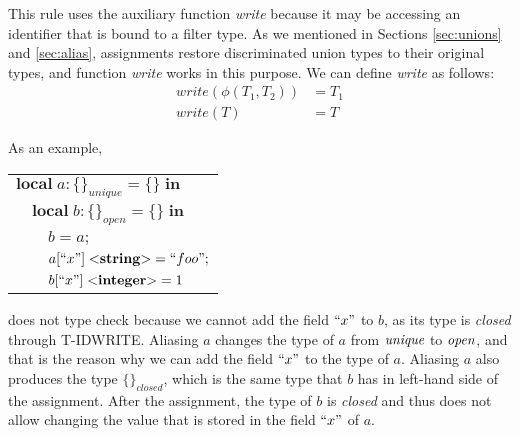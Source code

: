 This rule uses the auxiliary function \emph{write} because it may be
accessing an identifier that is bound to a filter type.
As we mentioned in Sections \ref{sec:unions} and \ref{sec:alias},
assignments restore discriminated union types to their original types,
and function \emph{write} works in this purpose.
We can define \emph{write} as follows:
\begin{align*}
write(\phi(T_{1},T_{2})) & = T_{1}\\
write(T) & = T
\end{align*}

As an example,
\begin{center}
\begin{tabular}{lll}
\multicolumn{3}{l}{$\mathbf{local} \; a:\{\}_{unique} = \{\} \; \mathbf{in}$}\\
& \multicolumn{2}{l}{$\mathbf{local} \; b:\{\}_{open} = \{\} \; \mathbf{in}$}\\
& & \multicolumn{1}{l}{$b = a;$}\\
& & \multicolumn{1}{l}{$a[``x"] \; {<}\mathbf{string}{>} = ``foo";$}\\
& & \multicolumn{1}{l}{$b[``x"] \; {<}\mathbf{integer}{>} = 1$}\\
\end{tabular}
\end{center}
does not type check because we cannot add the field $``x"$ to $b$,
as its type is \emph{closed} through \textsc{T-IDWRITE}.
Aliasing $a$ changes the type of $a$ from $\emph{unique}$ to
$\emph{open}$, and that is the reason why we can add the field
$``x"$ to the type of $a$.
Aliasing $a$ also produces the type $\{\}_{closed}$, which is
the same type that $b$ has in left-hand side of the assignment.
After the assignment, the type of $b$ is \emph{closed} and thus
does not allow changing the value that is stored in the field
$``x"$ of $a$.

